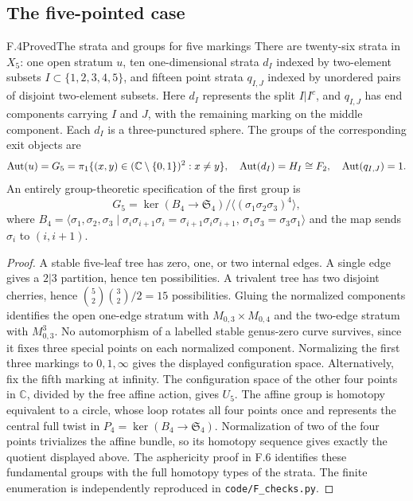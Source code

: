\subsection{The five-pointed case}

\begin{statement}{F.4}{Proved}{The strata and groups for five markings}
There are twenty-six strata in $X_5$: one open stratum $u$, ten
one-dimensional strata $d_I$ indexed by two-element subsets
$I\subset\{1,2,3,4,5\}$, and fifteen point strata $q_{I,J}$ indexed by
unordered pairs of disjoint two-element subsets.  Here $d_I$ represents
the split $I|I^c$, and $q_{I,J}$ has end components carrying $I$ and $J$,
with the remaining marking on the middle component.  Each $d_I$ is a
three-punctured sphere.  The groups of the corresponding exit objects are
\[
 \operatorname{Aut}(u)=G_5=\pi_1\{(x,y)\in(\mathbb C\setminus\{0,1\})^2:x\ne y\},
 \quad \operatorname{Aut}(d_I)=H_I\cong F_2,\quad\operatorname{Aut}(q_{I,J})=1.
\]
An entirely group-theoretic specification of the first group is
\[
 G_5=\ker(B_4\longrightarrow\mathfrak S_4)
       /\langle(\sigma_1\sigma_2\sigma_3)^4\rangle,
\]
where $B_4=\langle\sigma_1,\sigma_2,\sigma_3\mid
\sigma_i\sigma_{i+1}\sigma_i=\sigma_{i+1}\sigma_i\sigma_{i+1},\,
\sigma_1\sigma_3=\sigma_3\sigma_1\rangle$ and the map sends
$\sigma_i$ to $(i,i+1)$.
\end{statement}
\begin{proof}
A stable five-leaf tree has zero, one, or two internal edges.  A single
edge gives a $2|3$ partition, hence ten possibilities.  A trivalent tree
has two disjoint cherries, hence
$\binom52\binom32/2=15$ possibilities.  Gluing the normalized components
identifies the open one-edge stratum with $M_{0,3}\times M_{0,4}$ and
the two-edge stratum with $M_{0,3}^3$.  No automorphism of a labelled
stable genus-zero curve survives, since it fixes three special points on
each normalized component.  Normalizing the first three markings to
$0,1,\infty$ gives the displayed configuration space.  Alternatively,
fix the fifth marking at infinity.  The configuration space of the other
four points in $\mathbb C$, divided by the free affine action, gives
$U_5$.  The affine group is homotopy equivalent to a circle, whose loop
rotates all four points once and represents the central full twist in
$P_4=\ker(B_4\to\mathfrak S_4)$.  Normalization of two of the four
points trivializes the affine bundle, so its homotopy sequence gives
exactly the quotient displayed above.  The asphericity proof in F.6
identifies these fundamental groups with the full homotopy types of the
strata.  The finite enumeration is independently reproduced in
\texttt{code/F\_checks.py}.
\end{proof}

